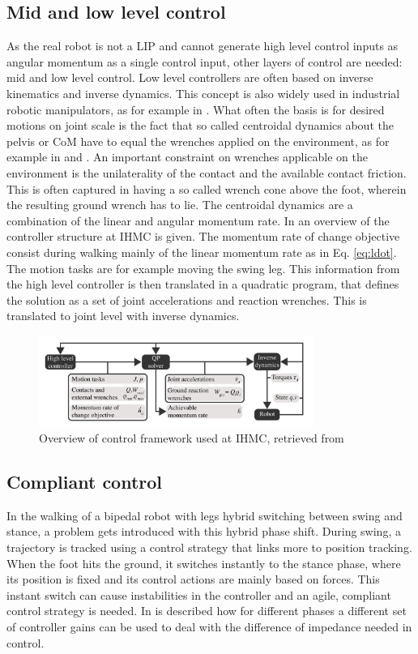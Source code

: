 \subsection{Mid and low level control}
As the real robot is not a \ac{LIP} and cannot generate high level control inputs as angular momentum as a single control input, other layers of control are needed: mid and low level control. Low level controllers are often based on inverse kinematics and inverse dynamics. This concept is also widely used in industrial robotic manipulators, as for example in \cite{asada1990inverse}. What often the basis is for desired motions on joint scale is the fact that so called centroidal dynamics about the pelvis or \ac{CoM} have to equal the wrenches applied on the environment, as for example in \cite{kajita2003resolved} and \cite{koolen2016design}. An important constraint on wrenches applicable on the environment is the unilaterality of the contact and the available contact friction. This is often captured in having a so called wrench cone above the foot, wherein the resulting ground wrench has to lie. The centroidal dynamics are a combination of the linear and angular momentum rate. In  an overview of the controller structure at IHMC is given. The momentum rate of change objective consist during walking mainly of the linear momentum rate as in Eq. \eqref{eq:ldot}. The motion tasks are for example moving the swing leg. This information from the high level controller is then translated in a quadratic program, that defines the solution as a set of joint accelerations and reaction wrenches. This is translated to joint level with inverse dynamics.
\begin{figure}[h]
\centering
\includegraphics[width=0.8\textwidth]{STYLESTUFF/controlframework.png}
\caption{Overview of control framework used at IHMC, retrieved from \cite{koolen2016design}}
\label{fig:controlframework}
\end{figure}
\subsection{Compliant control}
In the walking of a bipedal robot with legs hybrid switching between swing and stance, a problem gets introduced with this hybrid phase shift. During swing, a trajectory is tracked using a control strategy that links more to position tracking. When the foot hits the ground, it switches instantly to the stance phase, where its position is fixed and its control actions are mainly based on forces. This instant switch can cause instabilities in the controller and an agile, compliant control strategy is needed. In \cite{sentis2006whole} is described how for different phases a different set of controller gains can be used to deal with the difference of impedance needed in control. 

